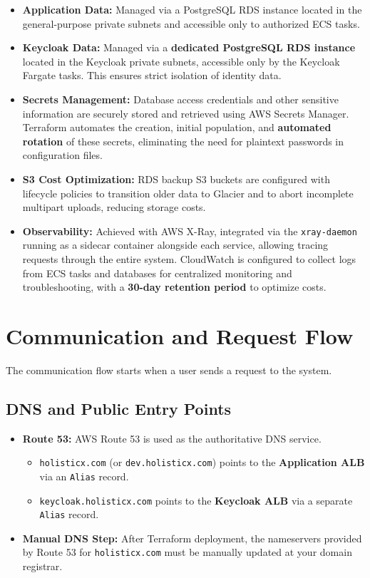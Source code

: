 \documentclass[a4paper,12pt]{article}
\begin{document}
\begin{itemize}
    \item \textbf{Application Data:} Managed via a PostgreSQL RDS instance located in the general-purpose private subnets and accessible only to authorized ECS tasks.
    \item \textbf{Keycloak Data:} Managed via a \textbf{dedicated PostgreSQL RDS instance} located in the Keycloak private subnets, accessible only by the Keycloak Fargate tasks. This ensures strict isolation of identity data.
    \item \textbf{Secrets Management:} Database access credentials and other sensitive information are securely stored and retrieved using AWS Secrets Manager. Terraform automates the creation, initial population, and \textbf{automated rotation} of these secrets, eliminating the need for plaintext passwords in configuration files.
    \item \textbf{S3 Cost Optimization:} RDS backup S3 buckets are configured with lifecycle policies to transition older data to Glacier and to abort incomplete multipart uploads, reducing storage costs.
    \item \textbf{Observability:} Achieved with AWS X-Ray, integrated via the \texttt{xray-daemon} running as a sidecar container alongside each service, allowing tracing requests through the entire system. CloudWatch is configured to collect logs from ECS tasks and databases for centralized monitoring and troubleshooting, with a \textbf{30-day retention period} to optimize costs.
\end{itemize}

\section{Communication and Request Flow}

The communication flow starts when a user sends a request to the system.

\subsection{DNS and Public Entry Points}
\begin{itemize}
    \item \textbf{Route 53:} AWS Route 53 is used as the authoritative DNS service.
    \begin{itemize}
        \item \texttt{holisticx.com} (or \texttt{dev.holisticx.com}) points to the \textbf{Application ALB} via an \texttt{Alias} record.
        \item \texttt{keycloak.holisticx.com} points to the \textbf{Keycloak ALB} via a separate \texttt{Alias} record.
    \end{itemize}
    \item \textbf{Manual DNS Step:} After Terraform deployment, the nameservers provided by Route 53 for \texttt{holisticx.com} must be manually updated at your domain registrar.
\end{itemize}
\end{document}
